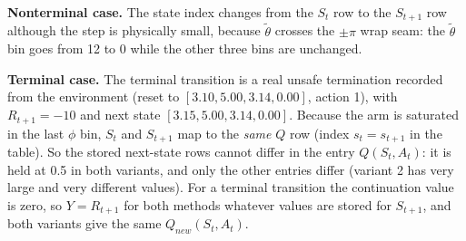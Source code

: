 \documentclass[11pt]{article}
\newcommand{\termS}{[3.10, 5.00, 3.14, 0.00]}
\newcommand{\termSn}{[3.15, 5.00, 3.14, 0.00]}
\newcommand{\termA}{1}
\newcommand{\termQsa}{0.5}
\newcommand{\termR}{-10}
\newcommand{\seamFrom}{12}
\newcommand{\seamTo}{0}
\begin{document}
\textbf{Nonterminal case.} The state index changes from the $S_t$ row to the $S_{t+1}$ row although the step is physically small, because $\widetilde\theta$ crosses the $\pm\pi$ wrap seam: the $\widetilde\theta$ bin goes from \seamFrom{} to \seamTo{} while the other three bins are unchanged.

\textbf{Terminal case.} The terminal transition is a real unsafe termination recorded from the environment (reset to $\termS$, action \termA), with $R_{t+1}=\termR$ and next state $\termSn$. Because the arm is saturated in the last $\phi$ bin, $S_t$ and $S_{t+1}$ map to the \emph{same} $Q$ row (index \mbox{$s_t=s_{t+1}$} in the table). So the stored next-state rows cannot differ in the entry $Q(S_t,A_t)$: it is held at \termQsa{} in both variants, and only the other entries differ (variant 2 has very large and very different values). For a terminal transition the continuation value is zero, so $Y=R_{t+1}$ for both methods whatever values are stored for $S_{t+1}$, and both variants give the same $Q_{new}(S_t,A_t)$.
\end{document}
